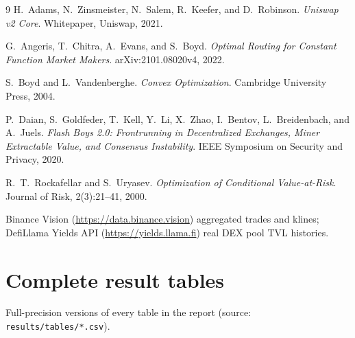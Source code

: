 \documentclass[11pt,a4paper]{article}
\theoremstyle{remark}
\newcommand{\code}[1]{\texttt{#1}}
\begin{document}
\begin{thebibliography}{9}
H.~Adams, N.~Zinsmeister, N.~Salem, R.~Keefer, and D.~Robinson.
\emph{Uniswap v2 Core}. Whitepaper, Uniswap, 2021.

G.~Angeris, T.~Chitra, A.~Evans, and S.~Boyd.
\emph{Optimal Routing for Constant Function Market Makers}.
arXiv:2101.08020v4, 2022.

S.~Boyd and L.~Vandenberghe.
\emph{Convex Optimization}. Cambridge University Press, 2004.

P.~Daian, S.~Goldfeder, T.~Kell, Y.~Li, X.~Zhao, I.~Bentov, L.~Breidenbach, and A.~Juels.
\emph{Flash Boys 2.0: Frontrunning in Decentralized Exchanges, Miner Extractable Value, and
Consensus Instability}. IEEE Symposium on Security and Privacy, 2020.

R.~T.~Rockafellar and S.~Uryasev.
\emph{Optimization of Conditional Value-at-Risk}.
Journal of Risk, 2(3):21--41, 2000.

Binance Vision (\url{https://data.binance.vision}) aggregated trades and klines; DefiLlama
Yields API (\url{https://yields.llama.fi}) real DEX pool TVL histories.
\end{thebibliography}

\appendix
\section{Complete result tables}
\label{app:tables}

Full-precision versions of every table in the report (source: \code{results/tables/*.csv}).
\end{document}
